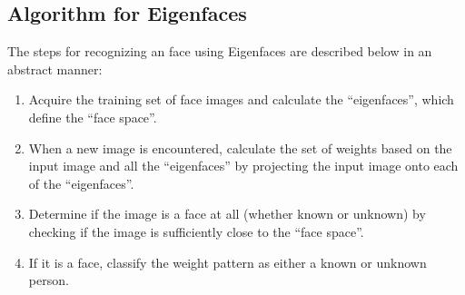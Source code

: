 \documentclass[12pt]{report}			%
\begin{document}
\subsection{ Algorithm for Eigenfaces }
The steps for recognizing an face using Eigenfaces are described below in an abstract manner:
\begin{enumerate}
\item Acquire the training set of face images and calculate the “eigenfaces”, which define the “face space”. 
\item When a new image is encountered, calculate the set of weights based on the input image and all the “eigenfaces” by projecting the input image onto each of the “eigenfaces”.
\item Determine if the image is a face at all (whether known or unknown) by checking if the image is sufficiently close to the “face space”. 
\item If it is a face, classify the weight pattern as either a known or unknown person. 
\end{enumerate}
\end{document}
